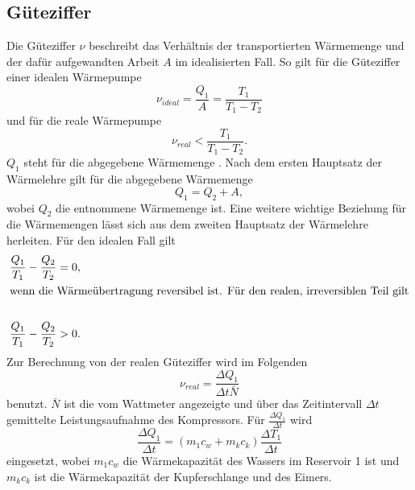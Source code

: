 \subsection{Güteziffer} %
\label{sub:Güteziffer}
Die Güteziffer $\nu$ beschreibt das Verhältnis der transportierten Wärmemenge und der dafür aufgewandten Arbeit $A$ im idealisierten Fall.
So gilt für die Güteziffer einer idealen Wärmepumpe
\begin{equation}
    \nu_{ideal} = \frac{Q_1}{A} = \frac{T_1}{T_1 - T_2}
    \label{eqn:Güteziffer_ideal}
\end{equation} 
und für die reale Wärmepumpe
\begin{equation*}
    \nu_{real} < \frac{T_1}{T_1 - T_2}.
\end{equation*}
$Q_1$ steht für die abgegebene Wärmemenge . 
Nach dem ersten Hauptsatz der Wärmelehre gilt für die abgegebene Wärmemenge
\begin{equation*}
    Q_1 = Q_2 + A ,
\end{equation*}
wobei $Q_2$  die entnommene Wärmemenge ist.
Eine weitere wichtige Beziehung für die Wärmemengen lässt sich aus dem zweiten Hauptsatz der Wärmelehre herleiten.
Für den idealen Fall gilt
\begin{align*}
    \frac{Q_1}{T_1}-\frac{Q_2}{T_2} = 0,\\
    \intertext{wenn die Wärmeübertragung reversibel ist. Für den realen, irreversiblen Teil gilt}\\
    \frac{Q_1}{T_1}-\frac{Q_2}{T_2} > 0.
\end{align*}
Zur Berechnung von der realen Güteziffer wird im Folgenden 
\begin{equation}
    \nu_{real} = \frac{\Delta Q_1}{\Delta t \bar{N}}
    \label{eqn:Güteziffer}
\end{equation}
benutzt. 
$\bar{N}$ ist die vom Wattmeter angezeigte und über das Zeitintervall $\Delta t$ gemittelte Leistungsaufnahme des Kompressors.
Für $\frac{\Delta Q_1}{\Delta t}$ wird
\begin{equation}
    \frac{\Delta Q_1}{\Delta t} = (m_1 c_w + m_k c_k)\frac{\Delta T_1}{\Delta t}
    \label{eqn:DeltaQ1}
\end{equation}
eingesetzt, wobei $m_1 c_w$ die Wärmekapazität des Wassers im Reservoir 1 ist und $m_k c_k$ ist die Wärmekapazität der Kupferschlange und des Eimers.
